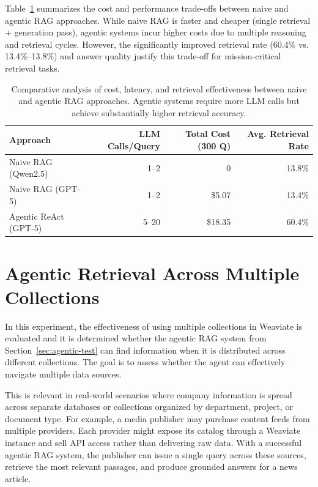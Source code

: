 Table~\ref{tab:naive-vs-agentic-tradeoffs} summarizes the cost and performance trade-offs between naive and agentic \gls{RAG} approaches. While naive \gls{RAG} is faster and cheaper (single retrieval + generation pass), agentic systems incur higher costs due to multiple reasoning and retrieval cycles. However, the significantly improved retrieval rate (60.4\% vs. 13.4\%–13.8\%) and answer quality justify this trade-off for mission-critical retrieval tasks.

\begin{table}[htbp]
    \centering
    \begin{tabular}{l r r r}
        \hline
        Approach & \gls{LLM} Calls/Query & Total Cost (300 Q) & Avg. Retrieval Rate \\
        \hline
        Naive \gls{RAG} (Qwen2.5) & 1--2 & 0 & 13.8\% \\
        Naive \gls{RAG} (\gls{GPT}-5) & 1--2 & \$5.07 & 13.4\% \\
        Agentic ReAct (\gls{GPT}-5) & 5--20 & \$18.35 & 60.4\% \\
        \hline
    \end{tabular}
    \caption{Comparative analysis of cost, latency, and retrieval effectiveness between naive and agentic \gls{RAG} approaches. Agentic systems require more \gls{LLM} calls but achieve substantially higher retrieval accuracy.}
    \label{tab:naive-vs-agentic-tradeoffs}
\end{table}

\section{Agentic Retrieval Across Multiple Collections}
\label{sec:agentic-retrieval-multiple}
In this experiment, the effectiveness of using multiple collections in Weaviate is evaluated and it is determined whether the agentic RAG system from Section~\ref{sec:agentic-test} can find information when it is distributed across different collections. The goal is to assess whether the agent can effectively navigate multiple data sources.

This is relevant in real-world scenarios where company information is spread across separate databases or collections organized by department, project, or document type. For example, a media publisher may purchase content feeds from multiple providers. Each provider might expose its catalog through a Weaviate instance and sell API access rather than delivering raw data. With a successful agentic RAG system, the publisher can issue a single query across these sources, retrieve the most relevant passages, and produce grounded answers for a news article.

